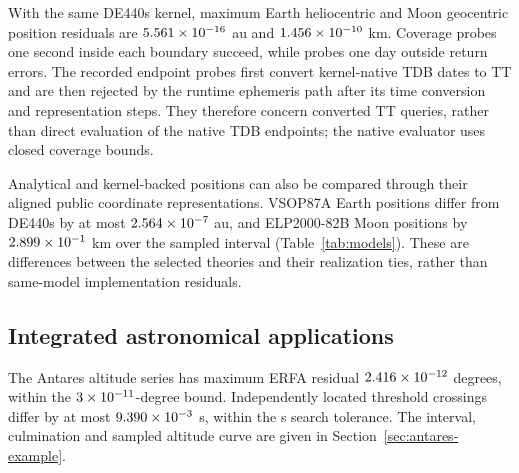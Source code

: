 \begin{table}[!tbp]
    \centering
    \caption{Native split-second time residuals against split-date ERFA for 13
        civil labels, including three inserted seconds. Maximum absolute differences
        and their declared acceptance bounds are reported in seconds.}
    \label{tab:time-extension}
    \footnotesize
    
\end{table}

With the same DE440s kernel, maximum Earth heliocentric and Moon geocentric position residuals are
$5.561\times10^{-16}$ au and $1.456\times10^{-10}$ km. Coverage probes one second inside each boundary succeed,
while probes one day outside return errors. The recorded endpoint probes first convert
kernel-native TDB dates to TT and are then rejected by the runtime ephemeris path after its time
conversion and representation steps. They therefore concern converted TT queries, rather than
direct evaluation of the native TDB endpoints; the native evaluator uses closed coverage bounds.

Analytical and kernel-backed positions can also be compared through their aligned public coordinate
representations. VSOP87A Earth positions differ from DE440s by at most $2.564\times10^{-7}$ au,
and ELP2000-82B Moon positions by $2.899\times10^{-1}$ km over the sampled interval
(Table~\ref{tab:models}). These are differences between the selected theories and their realization
ties, rather than same-model implementation residuals.

\begin{table}[!tbp]
    \centering
    \caption{Analytical-model differences from independent DE440s positions at
        1,000 TT epochs. Both paths use geometric positions in aligned canonical
        IAU 2006 mean-ecliptic J2000 axes. Statistics describe Euclidean position
        differences over the evaluated interval.}
    \label{tab:models}
    \small
    \setlength{\tabcolsep}{3pt}
    
\end{table}

\subsection{Integrated astronomical applications}

The Antares altitude series has maximum ERFA residual $2.416\times10^{-12}$ degrees, within
the $3\times10^{-11}$-degree bound. Independently located threshold crossings differ by at most
$9.390\times10^{-3}$ s, within the \ViewingEventTolerance{} s search tolerance. The interval,
culmination and sampled altitude curve are given in Section~\ref{sec:antares-example}.

